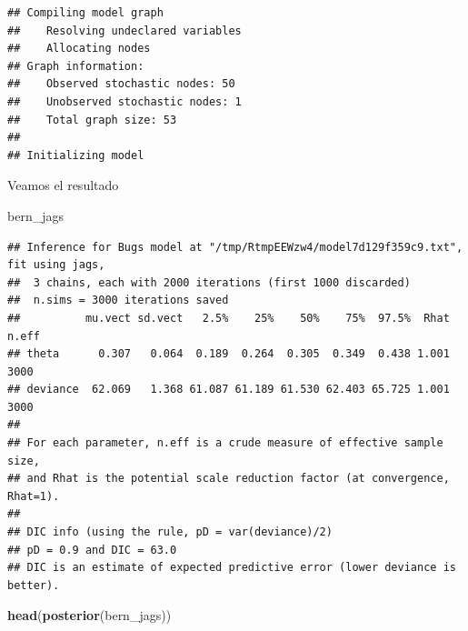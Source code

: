 \documentclass[
  12pt,
]{book}
\newenvironment{Shaded}{\begin{snugshade}}{\end{snugshade}}
\newcommand{\DataTypeTok}[1]{\textcolor[rgb]{0.13,0.29,0.53}{#1}}
\newcommand{\KeywordTok}[1]{\textcolor[rgb]{0.13,0.29,0.53}{\textbf{#1}}}
\newcommand{\NormalTok}[1]{#1}
\newcommand{\OperatorTok}[1]{\textcolor[rgb]{0.81,0.36,0.00}{\textbf{#1}}}
\newcommand{\StringTok}[1]{\textcolor[rgb]{0.31,0.60,0.02}{#1}}
\theoremstyle{definition}
\theoremstyle{definition}
\theoremstyle{definition}
\theoremstyle{remark}
\begin{document}
\begin{Shaded}
\end{Shaded}

\begin{verbatim}
## Compiling model graph
##    Resolving undeclared variables
##    Allocating nodes
## Graph information:
##    Observed stochastic nodes: 50
##    Unobserved stochastic nodes: 1
##    Total graph size: 53
## 
## Initializing model
\end{verbatim}

Veamos el resultado

\begin{Shaded}
\begin{Highlighting}[]
\NormalTok{bern_jags}
\end{Highlighting}
\end{Shaded}

\begin{verbatim}
## Inference for Bugs model at "/tmp/RtmpEEWzw4/model7d129f359c9.txt", fit using jags,
##  3 chains, each with 2000 iterations (first 1000 discarded)
##  n.sims = 3000 iterations saved
##          mu.vect sd.vect   2.5%    25%    50%    75%  97.5%  Rhat n.eff
## theta      0.307   0.064  0.189  0.264  0.305  0.349  0.438 1.001  3000
## deviance  62.069   1.368 61.087 61.189 61.530 62.403 65.725 1.001  3000
## 
## For each parameter, n.eff is a crude measure of effective sample size,
## and Rhat is the potential scale reduction factor (at convergence, Rhat=1).
## 
## DIC info (using the rule, pD = var(deviance)/2)
## pD = 0.9 and DIC = 63.0
## DIC is an estimate of expected predictive error (lower deviance is better).
\end{verbatim}

\begin{Shaded}
\begin{Highlighting}[]
\KeywordTok{head}\NormalTok{(}\KeywordTok{posterior}\NormalTok{(bern_jags))}
\end{Highlighting}
\end{Shaded}
\end{document}
